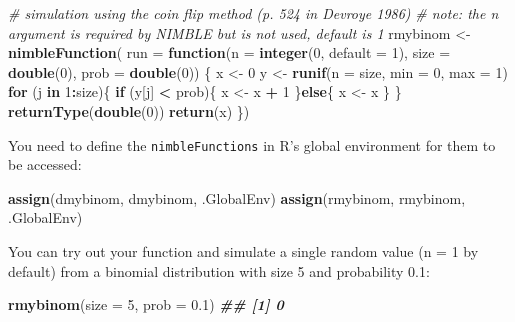 \documentclass[
  12pt,
]{krantz}
\newenvironment{Shaded}{\begin{snugshade}}{\end{snugshade}}
\newcommand{\AttributeTok}[1]{\textcolor[rgb]{0.13,0.29,0.53}{#1}}
\newcommand{\CommentTok}[1]{\textcolor[rgb]{0.56,0.35,0.01}{\textit{#1}}}
\newcommand{\ControlFlowTok}[1]{\textcolor[rgb]{0.13,0.29,0.53}{\textbf{#1}}}
\newcommand{\DecValTok}[1]{\textcolor[rgb]{0.00,0.00,0.81}{#1}}
\newcommand{\DocumentationTok}[1]{\textcolor[rgb]{0.56,0.35,0.01}{\textbf{\textit{#1}}}}
\newcommand{\FloatTok}[1]{\textcolor[rgb]{0.00,0.00,0.81}{#1}}
\newcommand{\FunctionTok}[1]{\textcolor[rgb]{0.13,0.29,0.53}{\textbf{#1}}}
\newcommand{\NormalTok}[1]{#1}
\newcommand{\OtherTok}[1]{\textcolor[rgb]{0.56,0.35,0.01}{#1}}
\newcommand{\SpecialCharTok}[1]{\textcolor[rgb]{0.81,0.36,0.00}{\textbf{#1}}}
\newcommand{\StringTok}[1]{\textcolor[rgb]{0.31,0.60,0.02}{#1}}
\begin{document}
\begin{Shaded}
\begin{Highlighting}[]
\CommentTok{\# simulation using the coin flip method (p. 524 in Devroye 1986)}
\CommentTok{\# note: the n argument is required by NIMBLE but is not used, default is 1}
\NormalTok{rmybinom }\OtherTok{\textless{}{-}} \FunctionTok{nimbleFunction}\NormalTok{(}
  \AttributeTok{run =} \ControlFlowTok{function}\NormalTok{(}\AttributeTok{n =} \FunctionTok{integer}\NormalTok{(}\DecValTok{0}\NormalTok{, }\AttributeTok{default =} \DecValTok{1}\NormalTok{),}
                 \AttributeTok{size =} \FunctionTok{double}\NormalTok{(}\DecValTok{0}\NormalTok{),}
                 \AttributeTok{prob =} \FunctionTok{double}\NormalTok{(}\DecValTok{0}\NormalTok{)) \{}
\NormalTok{      x }\OtherTok{\textless{}{-}} \DecValTok{0}
\NormalTok{      y }\OtherTok{\textless{}{-}} \FunctionTok{runif}\NormalTok{(}\AttributeTok{n =}\NormalTok{ size, }\AttributeTok{min =} \DecValTok{0}\NormalTok{, }\AttributeTok{max =} \DecValTok{1}\NormalTok{)}
      \ControlFlowTok{for}\NormalTok{ (j }\ControlFlowTok{in} \DecValTok{1}\SpecialCharTok{:}\NormalTok{size)\{}
        \ControlFlowTok{if}\NormalTok{ (y[j] }\SpecialCharTok{\textless{}}\NormalTok{ prob)\{}
\NormalTok{          x }\OtherTok{\textless{}{-}}\NormalTok{ x }\SpecialCharTok{+} \DecValTok{1}
\NormalTok{        \}}\ControlFlowTok{else}\NormalTok{\{}
\NormalTok{          x }\OtherTok{\textless{}{-}}\NormalTok{ x}
\NormalTok{        \}}
\NormalTok{      \}}
    \FunctionTok{returnType}\NormalTok{(}\FunctionTok{double}\NormalTok{(}\DecValTok{0}\NormalTok{))}
    \FunctionTok{return}\NormalTok{(x)    }
\NormalTok{  \})}
\end{Highlighting}
\end{Shaded}

You need to define the \texttt{nimbleFunctions} in R's global environment for them to be accessed:

\begin{Shaded}
\begin{Highlighting}[]
\FunctionTok{assign}\NormalTok{(}\StringTok{\textquotesingle{}dmybinom\textquotesingle{}}\NormalTok{, dmybinom, .GlobalEnv)}
\FunctionTok{assign}\NormalTok{(}\StringTok{\textquotesingle{}rmybinom\textquotesingle{}}\NormalTok{, rmybinom, .GlobalEnv)}
\end{Highlighting}
\end{Shaded}

You can try out your function and simulate a single random value (n = 1 by default) from a binomial distribution with size 5 and probability 0.1:

\begin{Shaded}
\begin{Highlighting}[]
\FunctionTok{rmybinom}\NormalTok{(}\AttributeTok{size =} \DecValTok{5}\NormalTok{, }\AttributeTok{prob =} \FloatTok{0.1}\NormalTok{)}
\DocumentationTok{\#\# [1] 0}
\end{Highlighting}
\end{Shaded}
\end{document}
